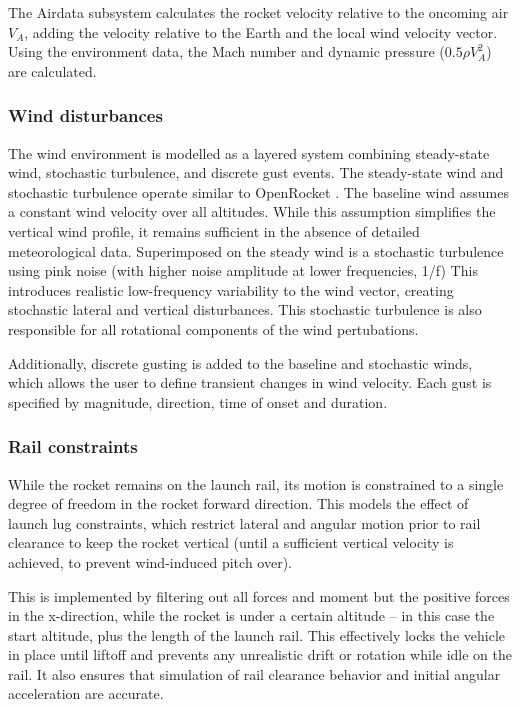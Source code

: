 The Airdata subsystem calculates the rocket velocity relative to the oncoming air $V_A$, adding the velocity relative to the Earth and the local wind velocity vector.
Using the environment data, the Mach number and dynamic pressure ($0.5 \rho V_A^2$) are calculated.


\subsubsection{Wind disturbances}
The wind environment is modelled as a layered system combining steady-state wind, stochastic turbulence, and discrete gust events. 
The steady-state wind and stochastic turbulence operate similar to OpenRocket \cite{niskanen2009}. 
The baseline wind assumes a constant wind velocity over all altitudes. 
While this assumption simplifies the vertical wind profile, it remains sufficient in the absence of detailed meteorological data.
Superimposed on the steady wind is a stochastic turbulence using  pink noise (with higher noise amplitude at lower frequencies, 1/f) 
This introduces realistic low-frequency variability to the wind vector, creating stochastic lateral and vertical disturbances. This stochastic turbulence is also responsible for all rotational components of the wind pertubations. 

Additionally, discrete gusting is added to the baseline and stochastic winds, which allows the user to define transient changes in wind velocity.
Each gust is specified by magnitude, direction, time of onset and duration.

\subsubsection{Rail constraints}
While the rocket remains on the launch rail, its motion is constrained to a single degree of freedom in the rocket forward direction. 
This models the effect of launch lug constraints, which restrict lateral and angular motion prior to rail clearance to keep the rocket vertical (until a sufficient vertical velocity is achieved, to prevent wind-induced pitch over).

This is implemented by filtering out all forces and moment but the positive forces in the x-direction, while the rocket is under a certain altitude -- in this case the start altitude, plus the length of the launch rail.
This effectively locks the vehicle in place until liftoff and prevents any unrealistic drift or rotation while idle on the rail. It also ensures that simulation of rail clearance behavior and initial angular acceleration are accurate.

